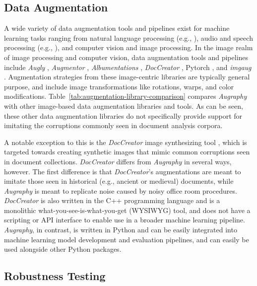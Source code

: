 \documentclass[runningheads]{llncs}
\begin{document}
\subsection{Data Augmentation}
A wide variety of data augmentation tools and pipelines exist for machine learning tasks ranging from natural language processing (e.g., \cite{feng-etal-2021-survey,fadaee-etal-2017-data,wei-zou-2019-eda}), audio and speech processing (e.g., \cite{ko15_interspeech,audiogmenter,audio-framework}), and computer vision and image processing.
In the image realm of image processing and computer vision, data augmentation tools and pipelines include \emph{Augly} \cite{Papakipos2022-gq-augly}, \emph{Augmentor} \cite{augmentor}, \emph{Albumentations} \cite{ref_albumentations}, \emph{DocCreator} \cite{ref_DocCreator}, Pytorch \cite{pytorch}, and \emph{imgaug} \cite{ref_imgaug}.
Augmentation strategies from these image-centric libraries are typically general purpose, and include image transformations like rotations, warps, and color modifications.
Table~\ref{tab:augmentation-library-comparison} compares \emph{Augraphy} with other image-based data augmentation libraries and tools.
As can be seen, these other data augmentation libraries do not specifically provide support for imitating the corruptions commonly seen in document analysis corpora.

A notable exception to this is the \emph{DocCreator} image synthesizing tool \cite{ref_DocCreator}, which is targeted towards creating synthetic images that mimic common corruptions seen in document collections.
\emph{DocCreator} differs from \emph{Augraphy} in several ways, however.
The first difference is that \emph{DocCreator}'s augmentations are meant to imitate those seen in historical (e.g., ancient or medieval) documents, while \emph{Augraphy} is meant to replicate noise caused by noisy office room procedures.
\emph{DocCreator} is also written in the C++ programming language and is a monolithic what-you-see-is-what-you-get (WYSIWYG) tool, and does not have a scripting or API interface to enable use in a broader machine learning pipeline.
\emph{Augraphy}, in contrast, is written in Python and can be easily integrated into machine learning model development and evaluation pipelines, and can easily be used alongside other Python packages.

\subsection{Robustness Testing}
\end{document}
